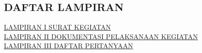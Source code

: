 \newpage
\begin{center}
    \renewcommand{\listsecondfigurename}{}
    
    \section*{\textbf{DAFTAR LAMPIRAN}}
\end{center}

\noindent \hyperref[lampiran1]{LAMPIRAN I SURAT KEGIATAN}
\dotfill \pageref{lampiran1}\\
\hyperref[lampiran2]{LAMPIRAN II DOKUMENTASI PELAKSANAAN KEGIATAN}
\dotfill \pageref{lampiran2}\\
\hyperref[lampiran3]{LAMPIRAN III DAFTAR PERTANYAAN}
\dotfill \pageref{lampiran3}\\